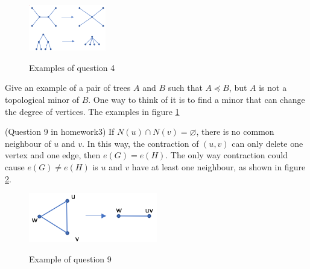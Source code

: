 \documentclass{article}
\begin{document}
  \begin{question}
  \begin{figure}[!h]
      \centering
      {\includegraphics[width=0.30\textwidth]{figure/problem4.png}}
      \caption{Examples of question 4}
      \label{prob4}
    \end{figure}
  
  Give an example of a pair of trees \(A\) and \(B\) such that \(A \preceq B\), but
\(A\) is not a topological minor of \(B\). One way to think of it is to find a minor that can change the degree of vertices. The examples in figure \ref{prob4} 
  \end{question}
    
  \begin{question}
    (Question 9 in homework3)
    If \(N(u)\cap N(v) = \varnothing \), there is no common neighbour of \(u\) and \(v\). In this way, the contraction of \((u,v)\) can only delete one vertex and one edge, then \(e(G) = e(H)\). The only way contraction could cause \(e(G) \neq e(H)\) is \(u\) and \(v\) have at least one neighbour, as shown in figure \ref{prob9}.
    \begin{figure}[!h]
      \centering
      {\includegraphics[width=0.5\textwidth]{figure/problem9.png}}
      \caption{Example of question 9}
      \label{prob9}
    \end{figure}

  \end{question}
\end{document}
